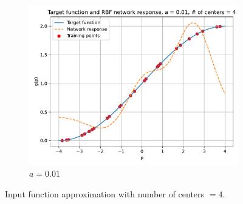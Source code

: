 \begin{figure}[htbp]
\begin{subfigure}{0.33\linewidth}
		\includegraphics[width=\linewidth]{../Problem 2/prob2_response_a_0.01_Cnum_4.pdf}
		\caption{$a=0.01$}
	\end{subfigure}\hfill
	\caption{Input function approximation with number of centers $=4$.}
	\label{fig:prob2_response_4}
\end{figure}

